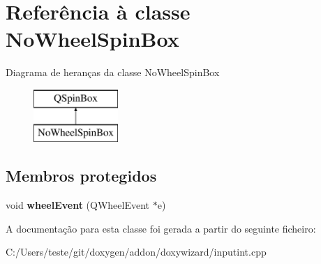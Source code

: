 \hypertarget{class_no_wheel_spin_box}{\section{Referência à classe No\-Wheel\-Spin\-Box}
\label{class_no_wheel_spin_box}
}
Diagrama de heranças da classe No\-Wheel\-Spin\-Box\begin{figure}[H]
\begin{center}
\leavevmode
\includegraphics[height=2.000000cm]{class_no_wheel_spin_box}
\end{center}
\end{figure}
\subsection*{Membros protegidos}
\begin{DoxyCompactItemize}
\item 
\hypertarget{class_no_wheel_spin_box_ab02de04457ef8554159ce7795177b057}{void {\bfseries wheel\-Event} (Q\-Wheel\-Event $\ast$e)}\label{class_no_wheel_spin_box_ab02de04457ef8554159ce7795177b057}

\end{DoxyCompactItemize}


A documentação para esta classe foi gerada a partir do seguinte ficheiro\-:\begin{DoxyCompactItemize}
\item 
C\-:/\-Users/teste/git/doxygen/addon/doxywizard/inputint.\-cpp\end{DoxyCompactItemize}
